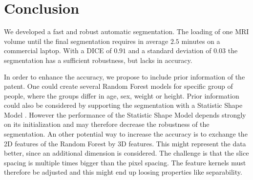 \section{Conclusion}
We developed a fast and robust automatic segmentation. The loading of one MRI volume until the final segmentation requires in average $2.5$ minutes on a commercial laptop. With a DICE of $0.91$ and a standard deviation of $0.03$ the segmentation has a sufficient robustness, but lacks in accuracy.

In order to enhance the accuracy, we propose to include prior information of the patent. One could create several Random Forest models for specific group of people, where the groups differ in age, sex, weight or height. Prior information could also be considered by supporting the segmentation with a Statistic Shape Model \cite{heimann2009statistical}. However the performance of the Statistic Shape Model depends strongly on its initialization and may therefore decrease the robustness of the segmentation.
An other potential way to increase the accuracy is to exchange the 2D features of the Random Forest by 3D features. This might represent the data better, since an additional dimension is considered. The challenge is that the slice spacing is multiple times bigger than the pixel spacing. The feature kernels must therefore be adjusted and this might end up loosing properties like separability.
